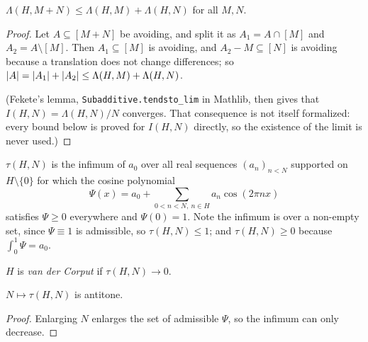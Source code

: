 \begin{lemma}
  \label{lem:intersective-converges}
  \leanok
  $\Lambda(H, M + N) \leq \Lambda(H, M) + \Lambda(H, N)$ for all $M, N$.
\end{lemma}
\begin{proof}
  \leanok
  Let $A \subseteq [M+N]$ be avoiding, and split it as $A_1 = A \cap [M]$ and
  $A_2 = A \setminus [M]$. Then $A_1 \subseteq [M]$ is avoiding, and
  $A_2 - M \subseteq [N]$ is avoiding because a translation does not change
  differences; so
  $\left\lvert A \right\rvert = \left\lvert A_1 \right\rvert + \left\lvert A_2 \right\rvert \leq \Lambda(H,M) + \Lambda(H,N)$.

  (Fekete's lemma, \texttt{Subadditive.tendsto\_lim} in Mathlib, then gives
  that $I(H,N) = \Lambda(H,N)/N$ converges. That consequence is not itself
  formalized: every bound below is proved for $I(H,N)$ directly, so the
  existence of the limit is never used.)
\end{proof}

\begin{definition}
  \label{def:vdcConst}
  \leanok
  $\tau(H,N)$ is the infimum of $a_0$ over all real sequences
  $(a_n)_{n < N}$ supported on $H \setminus \{0\}$ for which the cosine
  polynomial
  \[
    \Psi(x) = a_0 + \sum_{0 < n < N,\ n \in H} a_n \cos(2\pi n x)
  \]
  satisfies $\Psi \geq 0$ everywhere and $\Psi(0) = 1$.
  Note the infimum is over a non-empty set, since $\Psi \equiv 1$ is
  admissible, so $\tau(H,N) \leq 1$; and $\tau(H,N) \geq 0$ because
  $\int_0^1 \Psi = a_0$.
\end{definition}

\begin{definition}
  \label{def:isVdC}
  \leanok
  $H$ is \emph{van der Corput} if $\tau(H,N) \to 0$.
\end{definition}

\begin{lemma}
  \label{lem:vdcConst-antitone}
  \leanok
  $N \mapsto \tau(H, N)$ is antitone.
\end{lemma}
\begin{proof}
  \leanok
  Enlarging $N$ enlarges the set of admissible $\Psi$, so the infimum can only
  decrease.
\end{proof}

